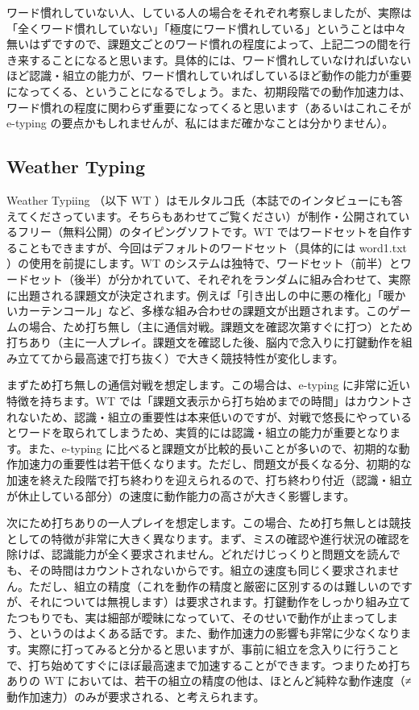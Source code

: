 ワード慣れしていない人、している人の場合をそれぞれ考察しましたが、実際は「全くワード慣れしていない」「極度にワード慣れしている」ということは中々無いはずですので、課題文ごとのワード慣れの程度によって、上記二つの間を行き来することになると思います。具体的には、ワード慣れしていなければいないほど認識・組立の能力が、ワード慣れしていればしているほど動作の能力が重要になってくる、ということになるでしょう。また、初期段階での動作加速力は、ワード慣れの程度に関わらず重要になってくると思います（あるいはこれこそが e-typing の要点かもしれませんが、私にはまだ確かなことは分かりません）。

\subsection{Weather Typing}

Weather Typiing （以下 WT ）はモルタルコ氏（本誌でのインタビューにも答えてくださっています。そちらもあわせてご覧ください）が制作・公開されているフリー（無料公開）のタイピングソフトです。WT ではワードセットを自作することもできますが、今回はデフォルトのワードセット（具体的には word1.txt ）の使用を前提にします。WT のシステムは独特で、ワードセット（前半）とワードセット（後半）が分かれていて、それぞれをランダムに組み合わせて、実際に出題される課題文が決定されます。例えば「引き出しの中に悪の権化」「暖かいカーテンコール」など、多様な組み合わせの課題文が出題されます。このゲームの場合、ため打ち無し（主に通信対戦。課題文を確認次第すぐに打つ）とため打ちあり（主に一人プレイ。課題文を確認した後、脳内で念入りに打鍵動作を組み立ててから最高速で打ち抜く）で大きく競技特性が変化します。

まずため打ち無しの通信対戦を想定します。この場合は、e-typing に非常に近い特徴を持ちます。WT では「課題文表示から打ち始めまでの時間」はカウントされないため、認識・組立の重要性は本来低いのですが、対戦で悠長にやっているとワードを取られてしまうため、実質的には認識・組立の能力が重要となります。また、e-typing に比べると課題文が比較的長いことが多いので、初期的な動作加速力の重要性は若干低くなります。ただし、問題文が長くなる分、初期的な加速を終えた段階で打ち終わりを迎えられるので、打ち終わり付近（認識・組立が休止している部分）の速度に動作能力の高さが大きく影響します。

次にため打ちありの一人プレイを想定します。この場合、ため打ち無しとは競技としての特徴が非常に大きく異なります。まず、ミスの確認や進行状況の確認を除けば、認識能力が全く要求されません。どれだけじっくりと問題文を読んでも、その時間はカウントされないからです。組立の速度も同じく要求されません。ただし、組立の精度（これを動作の精度と厳密に区別するのは難しいのですが、それについては無視します）は要求されます。打鍵動作をしっかり組み立てたつもりでも、実は細部が曖昧になっていて、そのせいで動作が止まってしまう、というのはよくある話です。また、動作加速力の影響も非常に少なくなります。実際に打ってみると分かると思いますが、事前に組立を念入りに行うことで、打ち始めてすぐにほぼ最高速まで加速することができます。つまりため打ちありの WT においては、若干の組立の精度の他は、ほとんど純粋な動作速度（≠動作加速力）のみが要求される、と考えられます。

